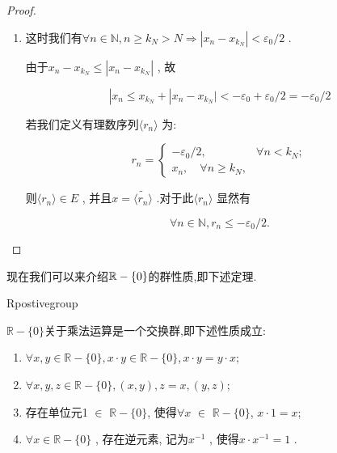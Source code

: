 \begin{proof}
\begin{enumerate}[label=\arabic*)]
\item 这时我们有\(\forall n \in \mathbb{N}, n \geqslant k_N > N \Longrightarrow |x_n - x_{k_N}| < \varepsilon_0/2\) .

由于\(x_n - x_{k_N} \leq |x_n - x_{k_N}|\) , 故

\[|x_n \leq x_{k_N} + |x_n - x_{k_N}| < -\varepsilon_0 + \varepsilon_0/2 = -\varepsilon_0/2\]

若我们定义有理数序列\(\langle r_n \rangle\) 为:

\[r_n = \begin{cases} -\varepsilon_0/2, & \forall n < k_N; \\ x_n, \quad  \forall n \geq k_N, \end{cases}\]

则\(\langle r_n \rangle \in E\) , 并且\(x = \widetilde{\langle r_n \rangle } \) .对于此\(\langle r_n \rangle\) 显然有

\[\forall n \in \mathbb{N}, r_n \leqslant -\varepsilon_0/2.\]
\end{enumerate}

\end{proof}

现在我们可以来介绍$\mathbb{R}-\{0\}$的群性质,即下述定理.

\begin{mythm}{}{Rpostivegroup}

$\mathbb{R}-\{0\}$关于乘法运算是一个交换群,即下述性质成立:

\begin{enumerate}[label=\arabic*)]
	\item \(\forall x,y \in \mathbb{R}-\{0\}, x \cdot y \in \mathbb{R}-\{0\}, x \cdot y = y \cdot x;\)
	\item \(\forall x,y,z \in \mathbb{R}-\{0\}, (x,y),z = x,(y,z);\)
	\item 存在单位元1 \(\in\) $\mathbb{R}-\{0\}$, 使得\(\forall x\) \(\in\) $\mathbb{R}-\{0\}$, $x\cdot 1=x$;
	\item \(\forall x \in \mathbb{R}-\{0\}\) , 存在逆元素, 记为\(x^{-1}\) , 使得\(x \cdot x^{-1} = 1\) .
\end{enumerate}

\end{mythm}

